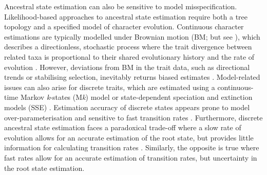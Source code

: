 \documentclass[11pt, a4paper]{article}
\newcommand{\ASE}{Ancestral state estimation }
\newcommand{\ase}{ancestral state estimation }
\begin{document}
\ASE can also be sensitive to model misspecification.
Likelihood-based approaches to \ase require both a tree topology and a specified model of character evolution.
Continuous character estimations are typically modelled under Brownian motion (BM; but see \citealp{elliot2014inferring, castiglione2020ancestral}), which describes a directionless, stochastic process where the trait divergence between related taxa is proportional to their shared evolutionary history and the rate of evolution \citep{felsenstein1985phylogenies,schluter1997likelihood,omeara2006testing}.
However, deviations from BM in the trait data, such as directional trends or stabilising selection, inevitably returns biased estimates \citep{webster2002testing, finarelli2006ancestral, albert2009fossils,finarelli2013potential}. 
Model-related issues can also arise for discrete traits, which are estimated using a continuous-time Markov \textit{k}-states (M\textit{k}) model \citep{pagel1994detecting,pagel1999maximum,lewis2001likelihood} or state-dependent speciation and extinction models (SSE) \citep{ng2014traits, holland2020accuracy}. %
Estimation accuracy of discrete states appears prone to model over-parameterisation and sensitive to fast transition rates \citep{mooers1999reconstructing, keating2023best}.
Furthermore, discrete \ase faces a paradoxical trade-off where a slow rate of evolution allows for an accurate estimation of the root state, but provides little information for calculating transition rates \citep{gascuel2020darwinian}.
Similarly, the opposite is true where fast rates allow for an accurate estimation of transition rates, but uncertainty in the root state estimation.%
\end{document}
